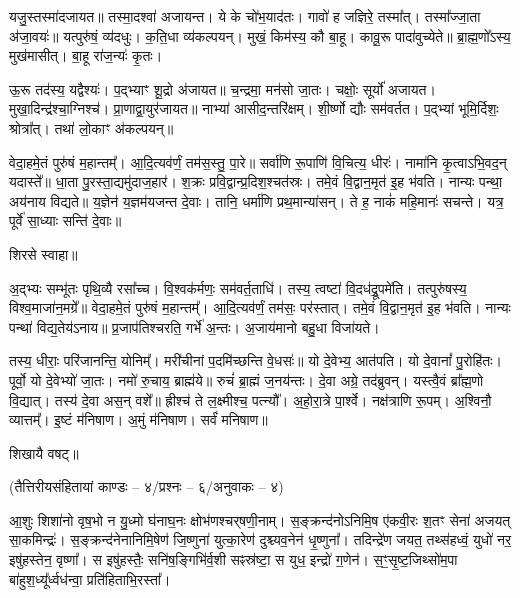 यजु॒स्तस्मा॑दजायत॥ तस्मा॒दश्वा॑ अजायन्त। ये के चो॑भ॒याद॑तः। गावो॑ ह जज्ञिरे॒ तस्मा᳚त्। तस्मा᳚ज्जा॒ता अ॑जा॒वयः॑॥ यत्पुरु॑षं॒ व्य॑दधुः। क॒ति॒धा व्य॑कल्पयन्। मुखं॒ किम॑स्य॒ कौ बा॒हू। कावू॒रू पादा॑वुच्येते॥ ब्रा॒ह्म॒णो᳚ऽस्य॒ मुख॑मासीत्। बा॒हू रा॑ज॒न्यः॑ कृ॒तः।

 ऊ॒रू तद॑स्य॒ यद्वैश्यः॑। प॒द्भ्याꣳ शू॒द्रो अ॑जायत॥ च॒न्द्रमा॒ मन॑सो जा॒तः। चक्षोः॒ सूर्यो॑ अजायत। मुखा॒दिन्द्र॑श्चा॒ग्निश्च॑। प्रा॒णाद्वा॒युर॑जायत॥ नाभ्या॑ आसीद॒न्तरि॑क्षम्। शी॒र्ष्णो द्यौः सम॑वर्तत। प॒द्भ्यां भूमि॒र्दिशः॒ श्रोत्रा᳚त्। तथा॑ लो॒काꣳ अ॑कल्पयन्॥

 वेदा॒हमे॒तं पुरु॑षं म॒हान्तम्᳚। आ॒दि॒त्यव॑र्णं॒ तम॑स॒स्तु॒ पा॒रे॥ सर्वा॑णि रू॒पाणि॑ वि॒चित्य॒ धीरः॑। नामा॑नि कृ॒त्वाऽभि॒वद॒न् यदास्ते᳚॥ धा॒ता पु॒रस्ता॒द्यमु॑दाज॒हार॑। श॒क्रः प्रवि॒द्वान्प्र॒दिश॒श्चत॑स्रः। तमे॒वं वि॒द्वान॒मृत॑ इ॒ह भ॑वति। नान्यः पन्था॒ अय॑नाय विद्यते॥ य॒ज्ञेन॑ य॒ज्ञम॑यजन्त दे॒वाः। तानि॒ धर्मा॑णि प्रथ॒मान्या॑सन्। ते ह॒ नाकं॑ महि॒मानः॑ सचन्ते। यत्र॒ पूर्वे॑ सा॒ध्याः सन्ति॑ दे॒वाः॥ 

शिरसे स्वाहा॥

{\small \closesection}


अ॒द्भ्यः सम्भू॑तः पृथि॒व्यै रसा᳚च्च। वि॒श्वक॑र्मणः॒ सम॑वर्त॒ताधि॑। तस्य॒ त्वष्टा॑ वि॒दध॑द्रू॒पमे॑ति। तत्पुरु॑षस्य॒ विश्व॒माजा॑न॒मग्रे᳚॥ वेदा॒हमे॒तं पुरु॑षं म॒हान्तम्᳚। आ॒दि॒त्यव॑र्णं॒ तम॑सः॒ पर॑स्तात्। तमे॒वं वि॒द्वान॒मृत॑ इ॒ह भ॑वति। नान्यः पन्था॑ विद्य॒तेय॑ऽनाय॥ प्र॒जाप॑तिश्चरति॒ गर्भे॑ अ॒न्तः। अ॒जाय॑मानो बहु॒धा विजा॑यते। 

तस्य॒ धीराः॒ परि॑जानन्ति॒ योनिम्᳚। मरी॑चीनां प॒दमि॑च्छन्ति वे॒धसः॑॥ यो दे॒वेभ्य॒ आत॑पति। यो दे॒वानां᳚ पु॒रोहि॑तः। पूर्वो॒ यो दे॒वेभ्यो॑ जा॒तः। नमो॑ रु॒चाय॒ ब्राह्म॑ये॥ रुचं॑ ब्रा॒ह्मं ज॒नय॑न्तः। दे॒वा अग्रे॒ तद॑ब्रुवन्। यस्त्वै॒वं ब्रा᳚ह्म॒णो वि॒द्यात्। तस्य॑ दे॒वा अस॒न् वशे᳚॥ ह्रीश्च॑ ते ल॒क्ष्मीश्च॒ पत्न्यौ᳚। अ॒हो॒रा॒त्रे पा॒र्श्वे। नक्ष॑त्राणि रू॒पम्। अ॒श्विनौ॒ व्यात्तम्᳚। इ॒ष्टं म॑निषाण। अ॒मुं म॑निषाण। सर्वं॑ मनिषाण॥ 

शिखायै वषट्॥

{\small \closesection}

\centerline{\normalsize (तैत्तिरीयसंहितायां काण्डः – ४/प्रश्नः – ६/अनुवाकः – ४)}

आ॒शुः शिशा॑नो वृष॒भो न यु॒ध्मो घ॑नाघ॒नः क्षोभ॑णश्चर्‌षणी॒नाम्। स॒ङ्क्रन्द॑नोऽनिमि॒ष ए॑कवी॒रः श॒तꣳ सेना॑ अजयत् सा॒कमिन्द्रः॑। स॒ङ्क्रन्द॑नेनानिमि॒षेण॑ जि॒ष्णुना॑ युत्का॒रेण॑ दुश्च्यव॒नेन॑ धृ॒ष्णुना᳚। तदिन्द्रे॑ण जयत॒ तथ्स॑हध्वं॒ युधो॑ नर॒ इषु॑हस्तेन॒ वृष्णा᳚। स इषु॑हस्तैः॒ सनि॑ष॒ङ्गिभि॑र्व॒शी सꣴस्र॑ष्टा॒ स युध॒ इन्द्रो॑ ग॒णेन॑। स॒ꣳ॒सृ॒ष्ट॒जिथ्सो॑म॒पा बा॑हुश॒ध्यू᳚र्ध्वध॑न्वा॒ प्रति॑हिताभि॒रस्ता᳚।

